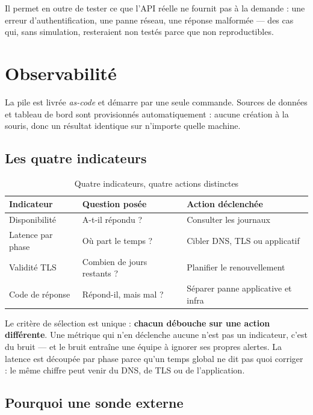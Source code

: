 \documentclass[11pt,a4paper]{article}
\begin{document}
Il permet en outre de tester ce que l'API réelle ne fournit pas à la
demande : une erreur d'authentification, une panne réseau, une réponse
malformée — des cas qui, sans simulation, resteraient non testés parce que
non reproductibles.

\section{Observabilité}

La pile est livrée \textit{as-code} et démarre par une seule commande.
Sources de données et tableau de bord sont provisionnés automatiquement :
aucune création à la souris, donc un résultat identique sur n'importe quelle
machine.

\subsection{Les quatre indicateurs}

\begin{table}[htbp]
\centering
\small
\begin{tabular}{@{}l l l@{}}
\toprule
\textbf{Indicateur} & \textbf{Question posée} & \textbf{Action déclenchée} \\
\midrule
Disponibilité      & A-t-il répondu ?              & Consulter les journaux \\
Latence par phase  & Où part le temps ?            & Cibler DNS, TLS ou applicatif \\
Validité TLS       & Combien de jours restants ?   & Planifier le renouvellement \\
Code de réponse    & Répond-il, mais mal ?         & Séparer panne applicative et infra \\
\bottomrule
\end{tabular}
\caption{Quatre indicateurs, quatre actions distinctes}
\end{table}

Le critère de sélection est unique : \textbf{chacun débouche sur une action
différente}. Une métrique qui n'en déclenche aucune n'est pas un indicateur,
c'est du bruit — et le bruit entraîne une équipe à ignorer ses propres
alertes. La latence est découpée par phase parce qu'un temps global ne dit
pas quoi corriger : le même chiffre peut venir du DNS, de TLS ou de
l'application.

\subsection{Pourquoi une sonde externe}
\end{document}
